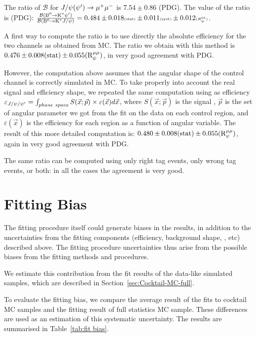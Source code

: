 The ratio of $\mathcal{B}$ for $J/\psi(\psi') \to \mu^{+} \mu^{-}$ is $7.54\pm0.86$ (PDG).
The value of the ratio is (PDG): $\frac{\mathcal{B}({\textrm{B}}{}^{0}\to\textrm{K}^\ast\psi')}{\mathcal{B}({\textrm{B}}{}^{0}\to\textrm{K}^\ast J/\psi)}=0.484 \pm 0.018 \textrm{\tiny{(stat)}} \pm 0.011 \textrm{\tiny{(syst)}} \pm 0.012 \textrm{\tiny{($R^{ee}_\psi$)}}$.

A first way to compute the ratio is to use directly the absolute efficiency for the two channels as obtained from MC.
The ratio we obtain with this method is $0.476\pm 0.008({\rm stat}) \pm 0.055({\rm R}_{\psi}^{\mu\mu})$, in very good agreement with PDG.

However, the computation above assumes that the angular shape of the control channel is correctly simulated in MC.
To take properly into account the real signal and efficiency shape, we repeated the same computation using as efficiency $\varepsilon_{J/\psi/\psi'}=\int_{phase~space}S(\vec{x};\vec{p})\times\varepsilon(\vec{x})d\vec{x}$, where $S(\vec{x};\vec{p})$ is the signal \pdf, $\vec{p}$ is the set of angular parameter we got from the fit on the data on each control region, and $\varepsilon(\vec{x})$ is the efficiency for each region as a function of angular variable.
The result of this more detailed computation is: $0.480\pm 0.008({\rm stat}) \pm 0.055({\rm R}_{\psi}^{\mu\mu})$, again in very good agreement with PDG.

The same ratio can be computed using only right tag events, only wrong tag events, or both: in all the cases the agreement is very good.

\section{Fitting Bias}
\label{sec:fitbias-syst}

The fitting procedure itself could generate biases in the results, in addition to the uncertainties from the fitting components (efficiency, background shape, \pdf, etc) described above.
The fitting procedure uncertainties thus arise from the possible biases from the fitting methods and procedures.

We estimate this contribution from the fit results of the data-like simulated samples, which are described in Section~\ref{sec:Cocktail-MC-full}.

To evaluate the fitting bias, we compare the average result of the fits to cocktail MC samples and the fitting result of full statistics MC sample.
These differences are used as an estimation of this systematic uncertainty.
The results are summarised in Table~\ref{tab:fit bias}.

